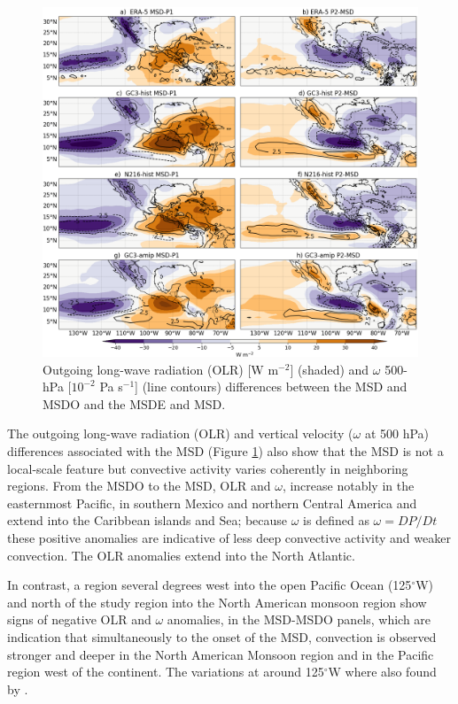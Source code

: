 
 \begin{figure}[t!]
\includegraphics[width=\linewidth]{figures/fig4_olrv_3.png}
\caption[OLR and vertical velocity composites]{Outgoing long-wave radiation (OLR) [W m$^{-2}$] (shaded) and $\omega$ 500-hPa [$10^{-2}$ Pa s$^{-1}$] (line contours) differences between the MSD and MSDO and the MSDE and MSD.}
\label{fig:olranom}
\end{figure}

 The outgoing long-wave radiation (OLR) and vertical velocity ($\omega$ at 500 hPa) differences associated with the MSD (Figure \ref{fig:olranom}) also show that the MSD is not a local-scale feature but convective activity varies coherently in neighboring regions. From the MSDO to the MSD, OLR and $\omega$, increase notably in the easternmost Pacific, in southern Mexico and northern Central America and extend into the Caribbean islands and Sea; because $\omega$ is defined as $\omega=DP/Dt$  these positive anomalies are indicative of less deep convective activity and weaker convection. The OLR anomalies extend into the North Atlantic. 
 
 In contrast, a region several degrees west into the open Pacific Ocean (125$^\circ$W) and north of the study region into the North American monsoon region show signs of negative OLR and $\omega$ anomalies, in the MSD-MSDO panels, which are indication that simultaneously to the onset of the MSD,  convection is observed stronger and deeper in the North American Monsoon region and in the Pacific region west of the continent. The variations at around 125$^\circ$W where also found by \cite{herrera2015}. 
 
